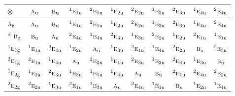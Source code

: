 \documentclass[10pt,a4paper]{article}
\numberwithin{equation}{section}
\newcommand{\irr}[1]{\text{\normalfont\scshape #1}}
\newcommand{\conjpair}[1]{{}^{#1}}
\newcommand{\ptag}[1]{\mathrm{#1}}
\newcommand{\irrprod}{\otimes}
\begin{document}
{\small\setlength{\tabcolsep}{3pt}\begin{longtable}{@{}lcccccccccc@{}}\toprule
$\irrprod$ & $\irr{a}_{\ptag{u}}$ & $\irr{b}_{\ptag{u}}$ & $\conjpair{1}\irr{e}_{1\ptag{u}}$ & $\conjpair{2}\irr{e}_{1\ptag{u}}$ & $\conjpair{1}\irr{e}_{2\ptag{u}}$ & $\conjpair{2}\irr{e}_{2\ptag{u}}$ & $\conjpair{1}\irr{e}_{3\ptag{u}}$ & $\conjpair{2}\irr{e}_{3\ptag{u}}$ & $\conjpair{1}\irr{e}_{4\ptag{u}}$ & $\conjpair{2}\irr{e}_{4\ptag{u}}$\\\midrule\endhead
\bottomrule\endfoot\endlastfoot
$\irr{a}_{\ptag{g}}$ & $\irr{a}_{\ptag{u}}$ & $\irr{b}_{\ptag{u}}$ & $\conjpair{1}\irr{e}_{1\ptag{u}}$ & $\conjpair{2}\irr{e}_{1\ptag{u}}$ & $\conjpair{1}\irr{e}_{2\ptag{u}}$ & $\conjpair{2}\irr{e}_{2\ptag{u}}$ & $\conjpair{1}\irr{e}_{3\ptag{u}}$ & $\conjpair{2}\irr{e}_{3\ptag{u}}$ & $\conjpair{1}\irr{e}_{4\ptag{u}}$ & $\conjpair{2}\irr{e}_{4\ptag{u}}$\\*
$\irr{b}_{\ptag{g}}$ & $\irr{b}_{\ptag{u}}$ & $\irr{a}_{\ptag{u}}$ & $\conjpair{2}\irr{e}_{4\ptag{u}}$ & $\conjpair{1}\irr{e}_{4\ptag{u}}$ & $\conjpair{2}\irr{e}_{3\ptag{u}}$ & $\conjpair{1}\irr{e}_{3\ptag{u}}$ & $\conjpair{2}\irr{e}_{2\ptag{u}}$ & $\conjpair{1}\irr{e}_{2\ptag{u}}$ & $\conjpair{2}\irr{e}_{1\ptag{u}}$ & $\conjpair{1}\irr{e}_{1\ptag{u}}$\\
$\conjpair{1}\irr{e}_{1\ptag{g}}$ & $\conjpair{1}\irr{e}_{1\ptag{u}}$ & $\conjpair{2}\irr{e}_{4\ptag{u}}$ & $\conjpair{1}\irr{e}_{2\ptag{u}}$ & $\irr{a}_{\ptag{u}}$ & $\conjpair{1}\irr{e}_{3\ptag{u}}$ & $\conjpair{2}\irr{e}_{1\ptag{u}}$ & $\conjpair{1}\irr{e}_{4\ptag{u}}$ & $\conjpair{2}\irr{e}_{2\ptag{u}}$ & $\irr{b}_{\ptag{u}}$ & $\conjpair{2}\irr{e}_{3\ptag{u}}$\\
$\conjpair{2}\irr{e}_{1\ptag{g}}$ & $\conjpair{2}\irr{e}_{1\ptag{u}}$ & $\conjpair{1}\irr{e}_{4\ptag{u}}$ & $\irr{a}_{\ptag{u}}$ & $\conjpair{2}\irr{e}_{2\ptag{u}}$ & $\conjpair{1}\irr{e}_{1\ptag{u}}$ & $\conjpair{2}\irr{e}_{3\ptag{u}}$ & $\conjpair{1}\irr{e}_{2\ptag{u}}$ & $\conjpair{2}\irr{e}_{4\ptag{u}}$ & $\conjpair{1}\irr{e}_{3\ptag{u}}$ & $\irr{b}_{\ptag{u}}$\\
$\conjpair{1}\irr{e}_{2\ptag{g}}$ & $\conjpair{1}\irr{e}_{2\ptag{u}}$ & $\conjpair{2}\irr{e}_{3\ptag{u}}$ & $\conjpair{1}\irr{e}_{3\ptag{u}}$ & $\conjpair{1}\irr{e}_{1\ptag{u}}$ & $\conjpair{1}\irr{e}_{4\ptag{u}}$ & $\irr{a}_{\ptag{u}}$ & $\irr{b}_{\ptag{u}}$ & $\conjpair{2}\irr{e}_{1\ptag{u}}$ & $\conjpair{2}\irr{e}_{4\ptag{u}}$ & $\conjpair{2}\irr{e}_{2\ptag{u}}$\\
$\conjpair{2}\irr{e}_{2\ptag{g}}$ & $\conjpair{2}\irr{e}_{2\ptag{u}}$ & $\conjpair{1}\irr{e}_{3\ptag{u}}$ & $\conjpair{2}\irr{e}_{1\ptag{u}}$ & $\conjpair{2}\irr{e}_{3\ptag{u}}$ & $\irr{a}_{\ptag{u}}$ & $\conjpair{2}\irr{e}_{4\ptag{u}}$ & $\conjpair{1}\irr{e}_{1\ptag{u}}$ & $\irr{b}_{\ptag{u}}$ & $\conjpair{1}\irr{e}_{2\ptag{u}}$ & $\conjpair{1}\irr{e}_{4\ptag{u}}$\\

\end{longtable}}
\end{document}
